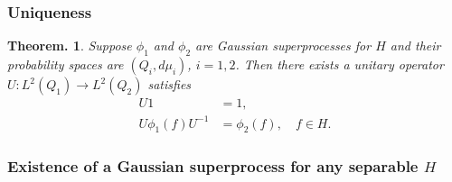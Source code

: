 \documentclass[openany, a4paper, oneside]{book}
\theoremstyle{break}
\newtheorem{thm}{Theorem.}[section]
\theoremstyle{breakdefn}
\begin{document}
\subsubsection{Uniqueness}
\label{sec-8-2-2-2-2}

\begin{thm}
 Suppose $\phi_1$ and $\phi_2$ are Gaussian superprocesses for $H$ and their probability spaces are $(Q_i, d \mu_i)$, $i=1,2$.
 Then there exists a unitary operator $U \colon L^2 (Q_1) \to L^2 (Q_2)$ satisfies
 \begin{align}
  U1 &= 1, \\
  U \phi_1 (f) U^{-1} &= \phi_2 (f), \quad f \in H.
 \end{align}
\end{thm}
\subsubsection{Existence of a Gaussian superprocess for any separable $H$}
\label{sec-8-2-2-2-3}
\end{document}

